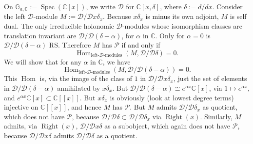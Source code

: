 On \(\mathbb{G}_{a,\mathbb{C}}:=\operatorname{Spec}(\mathbb{C}[x])\), we
write \(\mathcal{D}\) for \(\mathbb{C}[x,\delta]\), where
\(\delta:=d/dx\). Consider the left \(\mathcal{D}\)-module
\(M:=\mathcal{D}/\mathcal{D}x\delta_x\). Because \(x\delta_x\) is minus its
own adjoint, \(M\) is self dual. The only irreducible holonomic
\(\mathcal{D}\)-modules whose isomorphism classes are translation invariant
are \(\mathcal{D}/\mathcal{D}(\delta-\alpha)\), for \(\alpha\) in
\(\mathbb{C}\). Only for \(\alpha=0\) is
\(\mathcal{D}/\mathcal{D}(\delta-\alpha)\) RS. Therefore \(M\) has
\(\mathcal{P}\) if and only if
\[
  \operatorname{Hom}_{\text{left-}\mathcal{D}\text{-modules}}
  (M,\mathcal{D}/\mathcal{D}\delta)=0.
\]
We will show that for any \(\alpha\) in \(\mathbb{C}\), we have
\[
  \operatorname{Hom}_{\text{left-}\mathcal{D}\text{-modules}}
  (M,\mathcal{D}/\mathcal{D}(\delta-\alpha))=0.
\]
This \(\operatorname{Hom}\) is, via the image of the class of \(1\) in
\(\mathcal{D}/\mathcal{D}x\delta_x\), just the set of elements in
\(\mathcal{D}/\mathcal{D}(\delta-\alpha)\) annihilated by \(x\delta_x\). But
\(\mathcal{D}/\mathcal{D}(\delta-\alpha)\cong e^{\alpha x}\mathbb{C}[x]\), via
\(1\mapsto e^{\alpha x}\), and
\(e^{\alpha x}\mathbb{C}[x]\subset\mathbb{C}[[x]]\). But \(x\delta_x\) is
obviously (look at lowest degree terms) injective on \(\mathbb{C}[[x]]\), and
hence \(M\) has \(\mathcal{P}\). But \(M\) admits
\(\mathcal{D}/\mathcal{D}\delta_x\) as quotient, which does not have
\(\mathcal{P}\), because
\(\mathcal{D}/\mathcal{D}\delta\subset\mathcal{D}/\mathcal{D}\delta_x\) via
\(\operatorname{Right}(x)\). Similarly, \(M\) admits, via
\(\operatorname{Right}(x)\), \(\mathcal{D}/\mathcal{D}x\delta\) as a subobject,
which again does not have \(\mathcal{P}\), because
\(\mathcal{D}/\mathcal{D}x\delta\) admits \(\mathcal{D}/\mathcal{D}\delta\) as
a quotient.

